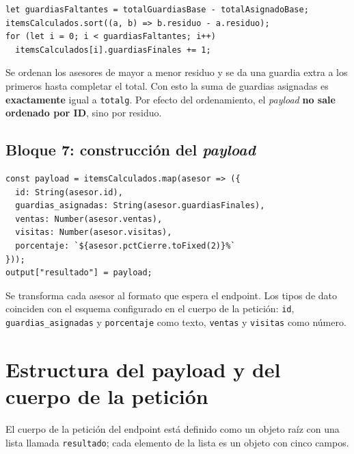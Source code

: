 \documentclass[11pt,a4paper]{article}
\newcommand{\code}[1]{\texttt{#1}}
\begin{document}
\begin{lstlisting}[style=codigo,language=JS]
let guardiasFaltantes = totalGuardiasBase - totalAsignadoBase;
itemsCalculados.sort((a, b) => b.residuo - a.residuo);
for (let i = 0; i < guardiasFaltantes; i++)
  itemsCalculados[i].guardiasFinales += 1;
\end{lstlisting}
Se ordenan los asesores de mayor a menor residuo y se da una guardia extra a los primeros hasta completar el total. Con esto la suma de guardias asignadas es \textbf{exactamente} igual a \code{totalg}. Por efecto del ordenamiento, el \emph{payload} \textbf{no sale ordenado por ID}, sino por residuo.

\subsection{Bloque 7: construcción del \emph{payload}}
\begin{lstlisting}[style=codigo,language=JS]
const payload = itemsCalculados.map(asesor => ({
  id: String(asesor.id),
  guardias_asignadas: String(asesor.guardiasFinales),
  ventas: Number(asesor.ventas),
  visitas: Number(asesor.visitas),
  porcentaje: `${asesor.pctCierre.toFixed(2)}%`
}));
output["resultado"] = payload;
\end{lstlisting}
Se transforma cada asesor al formato que espera el endpoint. Los tipos de dato coinciden con el esquema configurado en el cuerpo de la petición: \code{id}, \code{guardias\_asignadas} y \code{porcentaje} como texto, \code{ventas} y \code{visitas} como número.

\section{Estructura del payload y del cuerpo de la petición}
\label{sec:payload}

El cuerpo de la petición del endpoint está definido como un objeto raíz con una lista llamada \code{resultado}; cada elemento de la lista es un objeto con cinco campos.
\end{document}
